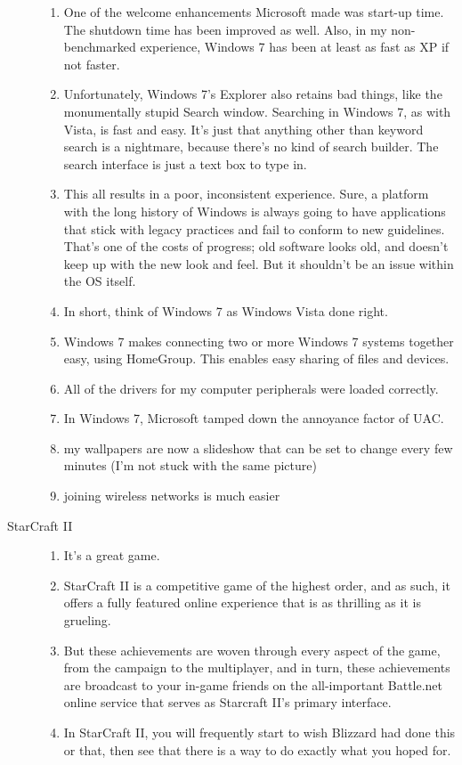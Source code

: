 \documentclass{article}
\begin{document}
\begin{description}
\begin{enumerate}
\item One of the welcome enhancements Microsoft made was start-up time. The shutdown time has been improved as well. Also, in my non-benchmarked experience, Windows 7 has been at least as fast as XP if not faster.
\item Unfortunately, Windows 7's Explorer also retains bad things, like the monumentally stupid Search window. Searching in Windows 7, as with Vista, is fast and easy. It's just that anything other than keyword search is a nightmare, because there's no kind of search builder. The search interface is just a text box to type in.
\item This all results in a poor, inconsistent experience. Sure, a platform with the long history of Windows is always going to have applications that stick with legacy practices and fail to conform to new guidelines. That's one of the costs of progress; old software looks old, and doesn't keep up with the new look and feel. But it shouldn't be an issue within the OS itself.
\item In short, think of Windows 7 as Windows Vista done right.
\item Windows 7 makes connecting two or more Windows 7 systems together easy, using HomeGroup. This enables easy sharing of files and devices.
\item All of the drivers for my computer peripherals were loaded correctly.
\item In Windows 7, Microsoft tamped down the annoyance factor of UAC.
\item my wallpapers are now a slideshow that can be set to change every few minutes (I'm not stuck with the same picture)
\item joining wireless networks is much easier
\end{enumerate}
\item[StarCraft II]
\begin{enumerate}
\item It's a great game.
\item StarCraft II is a competitive game of the highest order, and as such, it offers a fully featured online experience that is as thrilling as it is grueling.
\item But these achievements are woven through every aspect of the game, from the campaign to the multiplayer, and in turn, these achievements are broadcast to your in-game friends on the all-important Battle.net online service that serves as Starcraft II's primary interface.
\item In StarCraft II, you will frequently start to  wish Blizzard had done this or that, then see that there is a way to do exactly what you hoped for.

\end{enumerate}
\end{description}
\end{document}
